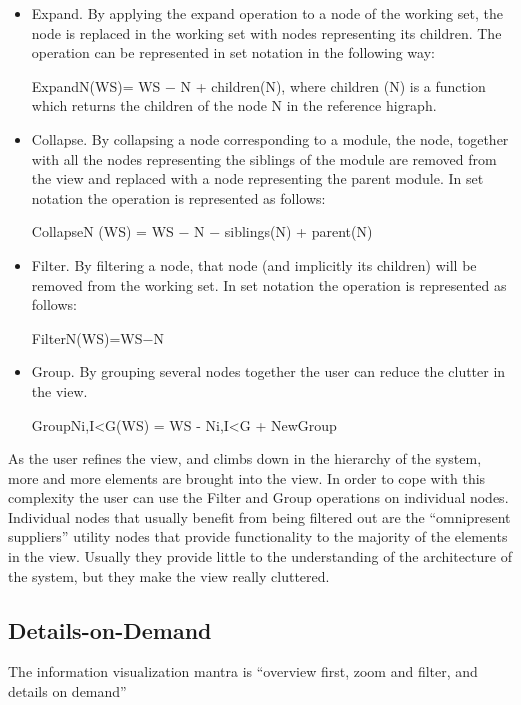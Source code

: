 \documentclass[preprint,12pt]{elsarticle}
\begin{document}
\begin{itemize}

\item Expand. By applying the expand operation to a node of the working set, the node is replaced in the working set with nodes representing its children. The operation can be represented in set notation in the following way:

ExpandN(WS)= WS − N + children(N), where children (N) is a function 	which returns the children of the node N in the reference higraph.

\item Collapse. By collapsing a node corresponding to a module, the node, together with all the nodes representing the siblings of the module are removed from the view and replaced with a node representing the parent module. In set notation the operation is represented as follows:

CollapseN (WS) = WS − N − siblings(N) + parent(N)

\item Filter.
By filtering a node, that node (and implicitly its children) will be removed from the working set. In set notation the operation is represented as follows:

FilterN(WS)=WS−N


\item Group.
By grouping several nodes together the user can reduce the clutter in the view. 

GroupNi,I<G(WS) = WS - Ni,I<G + NewGroup


\end{itemize}

As the user refines the view, and climbs down in the hierarchy of the system, more and more elements are brought into the view. In order to cope with this complexity the user can use the Filter and Group operations on individual nodes. Individual nodes that usually benefit from being filtered out are the “omnipresent suppliers” utility nodes that provide functionality to the majority of the elements in the view. Usually they provide little to the understanding of the architecture of the system, but they make the view really cluttered. 


\newpage
\subsection {Details-on-Demand}

The information visualization mantra is “overview first, zoom and filter, and details on demand” 
\end{document}
